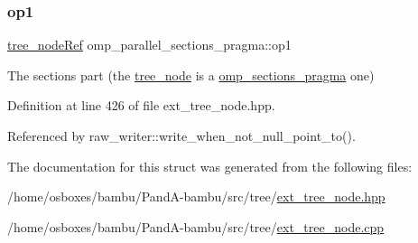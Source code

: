 \subsubsection{\texorpdfstring{op1}{op1}}
{\footnotesize\ttfamily \hyperlink{tree__node_8hpp_a6ee377554d1c4871ad66a337eaa67fd5}{tree\+\_\+node\+Ref} omp\+\_\+parallel\+\_\+sections\+\_\+pragma\+::op1}



The sections part (the \hyperlink{classtree__node}{tree\+\_\+node} is a \hyperlink{structomp__sections__pragma}{omp\+\_\+sections\+\_\+pragma} one) 



Definition at line 426 of file ext\+\_\+tree\+\_\+node.\+hpp.



Referenced by raw\+\_\+writer\+::write\+\_\+when\+\_\+not\+\_\+null\+\_\+point\+\_\+to().



The documentation for this struct was generated from the following files\+:\begin{DoxyCompactItemize}
\item 
/home/osboxes/bambu/\+Pand\+A-\/bambu/src/tree/\hyperlink{ext__tree__node_8hpp}{ext\+\_\+tree\+\_\+node.\+hpp}\item 
/home/osboxes/bambu/\+Pand\+A-\/bambu/src/tree/\hyperlink{ext__tree__node_8cpp}{ext\+\_\+tree\+\_\+node.\+cpp}\end{DoxyCompactItemize}

